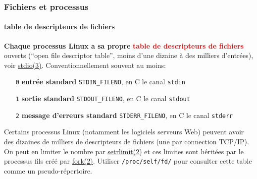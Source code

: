 \documentclass[xcolor=svgnames,final,smaller,a4]{beamer}
\begin{document}
\begin{frame}
  \frametitle{Fichiers et processus}
  \framesubtitle{table de descripteurs de fichiers}

  \textbf{Chaque processus Linux a sa propre}
  \textbf{\textcolor{red}{table de descripteurs de fichiers}} ouverts
    (``open file descriptor table'', moins d'une dizaine à des
    milliers d'entrées), voir
    \href{https://man7.org/linux/man-pages/man3/stdio.3.html}{stdio(3)}. Conventionnellement
    souvent au moins:

  \begin{itemize}
    \item[\texttt{0}]  \textbf{entrée standard} \texttt{STDIN\_FILENO}, en C le canal \texttt{stdin}
    \item[\texttt{1}]   \textbf{sortie standard} \texttt{STDOUT\_FILENO}, en C le canal \texttt{stdout}
    \item[\texttt{2}]   \textbf{message d'erreurs standard} \texttt{STDERR\_FILENO}, en C le canal \texttt{stderr}
  \end{itemize}

  \vspace{0.3cm}

  Certains processus Linux (notamment les logiciels serveurs Web)
  peuvent avoir des dizaines de milliers de descripteurs de fichiers
  (une par connection TCP/IP). On peut en limiter le nombre par
  \href{https://man7.org/linux/man-pages/man2/setrlimit.2.html}{setrlimit(2)}
  et ces limites sont héritées par le processus fils créé par
  \href{https://man7.org/linux/man-pages/man2/fork.2.html}{fork(2)}. Utiliser
  \texttt{/proc/self/fd/} pour consulter cette table comme un
  pseudo-répertoire.
\end{frame}
\end{document}

